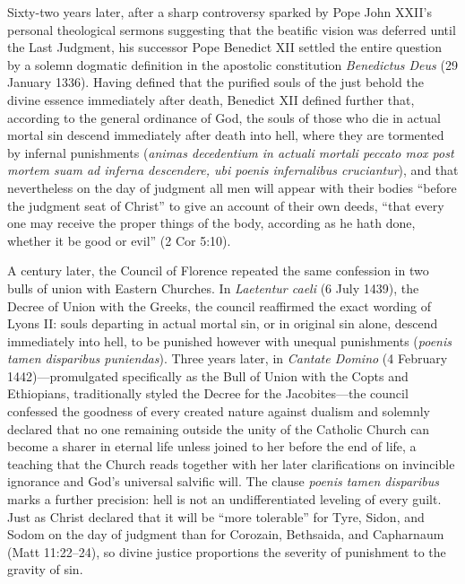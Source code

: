 Sixty-two years later, after a sharp controversy sparked by Pope John XXII's personal theological sermons suggesting that the beatific vision was deferred until the Last Judgment, his successor Pope Benedict XII settled the entire question by a solemn dogmatic definition in the apostolic constitution \textit{Benedictus Deus} (29 January 1336). Having defined that the purified souls of the just behold the divine essence immediately after death, Benedict XII defined further that, according to the general ordinance of God, the souls of those who die in actual mortal sin descend immediately after death into hell, where they are tormented by infernal punishments (\textit{animas decedentium in actuali mortali peccato mox post mortem suam ad inferna descendere, ubi poenis infernalibus cruciantur}), and that nevertheless on the day of judgment all men will appear with their bodies ``before the judgment seat of Christ'' to give an account of their own deeds, ``that every one may receive the proper things of the body, according as he hath done, whether it be good or evil'' (2 Cor 5:10).

A century later, the Council of Florence repeated the same confession in two bulls of union with Eastern Churches. In \textit{Laetentur caeli} (6 July 1439), the Decree of Union with the Greeks, the council reaffirmed the exact wording of Lyons II: souls departing in actual mortal sin, or in original sin alone, descend immediately into hell, to be punished however with unequal punishments (\textit{poenis tamen disparibus puniendas}). Three years later, in \textit{Cantate Domino} (4 February 1442)---promulgated specifically as the Bull of Union with the Copts and Ethiopians, traditionally styled the Decree for the Jacobites---the council confessed the goodness of every created nature against dualism and solemnly declared that no one remaining outside the unity of the Catholic Church can become a sharer in eternal life unless joined to her before the end of life, a teaching that the Church reads together with her later clarifications on invincible ignorance and God's universal salvific will. The clause \textit{poenis tamen disparibus} marks a further precision: hell is not an undifferentiated leveling of every guilt. Just as Christ declared that it will be ``more tolerable'' for Tyre, Sidon, and Sodom on the day of judgment than for Corozain, Bethsaida, and Capharnaum (Matt 11:22--24), so divine justice proportions the severity of punishment to the gravity of sin.

